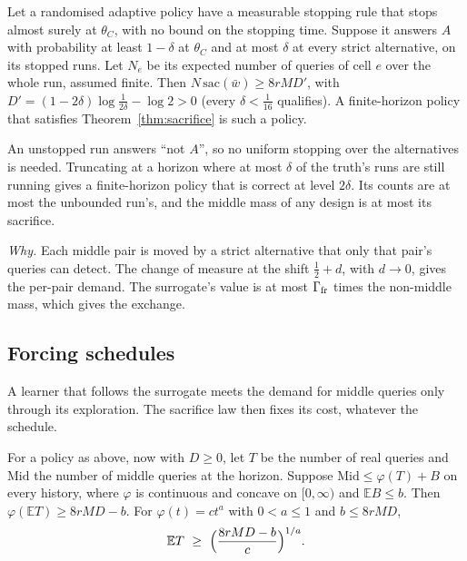 \begin{theorem}
\label{thm:sacstop}
Let a randomised adaptive policy have a measurable stopping rule that stops almost surely at
$\theta_{C}$, with no bound on the stopping time. Suppose it answers $A$ with probability at least
$1-\delta$ at $\theta_{C}$ and at most $\delta$ at every strict alternative, on its stopped runs.
Let $N_{e}$ be its expected number of queries of cell $e$ over the whole run, assumed finite. Then
$N\,\mathrm{sac}(\bar w)\ge8rMD'$, with $D'=(1-2\delta)\log\frac1{2\delta}-\log2>0$ (every
$\delta<\frac1{16}$ qualifies). A finite-horizon policy that satisfies Theorem~\ref{thm:sacrifice}
is such a policy.
\end{theorem}


An unstopped run answers ``not $A$'', so no uniform stopping over the alternatives is needed.
Truncating at a horizon where at most $\delta$ of the truth's runs are still running gives a
finite-horizon policy that is correct at level $2\delta$. Its counts are at most the unbounded
run's, and the middle mass of any design is at most its sacrifice.

\emph{Why.} Each middle pair is moved by a strict alternative that only that pair's queries can
detect. The change of measure at the shift $\frac12+d$, with $d\to0$, gives the per-pair demand.
The surrogate's value is at most $\Gamma_{\rm fr}$ times the non-middle mass, which gives the
exchange.

\subsection{Forcing schedules}

A learner that follows the surrogate meets the demand for middle queries only through its
exploration. The sacrifice law then fixes its cost, whatever the schedule.

\begin{theorem}
\label{thm:forcing}
For a policy as above, now with $D\ge0$, let $T$ be the number of real queries and $\mathrm{Mid}$
the number of middle queries at the horizon. Suppose $\mathrm{Mid}\le\varphi(T)+B$ on every
history, where
$\varphi$ is continuous and concave on $[0,\infty)$ and $\mathbb{E}B\le b$. Then
$\varphi(\mathbb{E}T)\ge8rMD-b$. For $\varphi(t)=ct^{a}$ with $0<a\le1$ and
$b\le 8rMD$,
\[
\mathbb{E}T\ \ge\ \Bigl(\frac{8rMD-b}{c}\Bigr)^{1/a}.
\]
\end{theorem}

